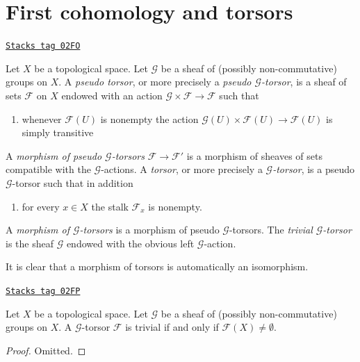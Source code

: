 \section{First cohomology and torsors}
\label{cohomology-section-h1-torsors}
\begin{definition}[Torsor]
\label{cohomology-definition-torsor}
\href{https://stacks.math.columbia.edu/tag/02FO}{\texttt{Stacks tag 02FO}}

Let $X$ be a topological space.
Let $\mathcal{G}$ be a sheaf of (possibly non-commutative) groups on $X$.
A {\it pseudo torsor}, or more precisely a {\it pseudo $\mathcal{G}$-torsor},
is a sheaf of sets $\mathcal{F}$ on $X$ endowed with an action
$\mathcal{G} \times \mathcal{F} \to \mathcal{F}$ such that
\begin{enumerate}
\item whenever $\mathcal{F}(U)$ is nonempty the action
$\mathcal{G}(U) \times \mathcal{F}(U) \to \mathcal{F}(U)$
is simply transitive
\end{enumerate}
A {\it morphism of pseudo $\mathcal{G}$-torsors} $\mathcal{F} \to \mathcal{F}'$
is a morphism of sheaves of sets compatible with the
$\mathcal{G}$-actions. A {\it torsor}, or more precisely a
{\it $\mathcal{G}$-torsor}, is a pseudo $\mathcal{G}$-torsor such
that in addition
\begin{enumerate}
\item[(2)] for every $x \in X$ the stalk $\mathcal{F}_x$ is nonempty.
\end{enumerate}
A {\it morphism of $\mathcal{G}$-torsors} is a morphism of
pseudo $\mathcal{G}$-torsors. The {\it trivial $\mathcal{G}$-torsor}
is the sheaf $\mathcal{G}$ endowed with the obvious left
$\mathcal{G}$-action.
\end{definition}

It is clear that a morphism of torsors is automatically an isomorphism.

\begin{lemma}
\label{cohomology-lemma-trivial-torsor}
\href{https://stacks.math.columbia.edu/tag/02FP}{\texttt{Stacks tag 02FP}}

Let $X$ be a topological space.
Let $\mathcal{G}$ be a sheaf of (possibly non-commutative) groups on $X$.
A $\mathcal{G}$-torsor $\mathcal{F}$ is trivial if and only if
$\mathcal{F}(X) \not = \emptyset$.
\end{lemma}

\begin{proof}
Omitted.
\end{proof}

